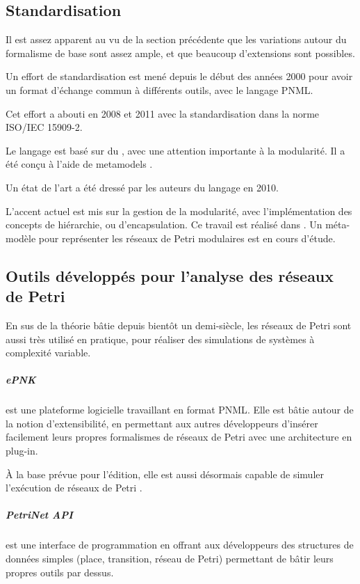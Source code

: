 \subsection{Standardisation}
Il est assez apparent au vu de la section précédente que les variations autour du formalisme de base sont assez ample, et que beaucoup d'extensions sont possibles.

Un effort de standardisation est mené depuis le début des années 2000 pour avoir un format d'échange commun à différents outils, avec le langage \ac{PNML}.

Cet effort a abouti en 2008 et 2011 avec la standardisation dans la norme ISO/IEC 15909-2.

Le langage est basé sur du , avec une attention importante à la modularité. Il a été conçu à l'aide de \glspl{metamodel} .

Un état de l'art\cite{hillah2010standardisation} a été dressé par les auteurs du langage en 2010.

L'accent actuel est mis sur la gestion de la modularité, avec l'implémentation des concepts de hiérarchie, ou d'encapsulation. Ce travail est réalisé dans . Un méta-modèle pour représenter les réseaux de Petri modulaires est en cours d'étude\cite{marechal2012modular}.

\subsection{Outils développés pour l'analyse des réseaux de Petri}
En sus de la théorie bâtie depuis bientôt un demi-siècle, les réseaux de Petri sont aussi très utilisé en pratique, pour réaliser des simulations de systèmes à complexité variable.

\subparagraph{ePNK} est une plateforme logicielle travaillant en format \ac{PNML}. Elle est bâtie autour de la notion d'extensibilité, en permettant aux autres développeurs d'insérer facilement leurs propres formalismes de réseaux de Petri avec une architecture en plug-in.

À la base prévue pour l'édition, elle est aussi désormais capable de simuler l'exécution de réseaux de Petri  \cite{kindler2013simulator}.

\subparagraph{PetriNet API} \cite{lohmann2009petri} est une interface de programmation en  offrant aux développeurs des structures de données simples (place, transition, réseau de Petri) permettant de bâtir leurs propres outils par dessus.

